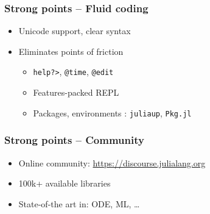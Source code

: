 \documentclass{beamer}
\begin{document}
\begin{frame}
    \frametitle{Strong points -- Fluid coding}
    \begin{itemize}
        \item Unicode support, clear syntax
        \item Eliminates points of friction
        \begin{itemize}
            \item {\tt help?>}, {\tt @time}, {\tt @edit}
            \item Features-packed REPL
            \item Packages, environments : \texttt{juliaup}, \texttt{Pkg.jl}
        \end{itemize}
    \end{itemize}
\end{frame}

\begin{frame}
    \frametitle{Strong points -- Community}
    \begin{itemize}
        \item Online community: \url{https://discourse.julialang.org}
        \item 100k+ available libraries
        \item State-of-the art in: ODE, ML, \dots
    \end{itemize}
\end{frame}
\end{document}
